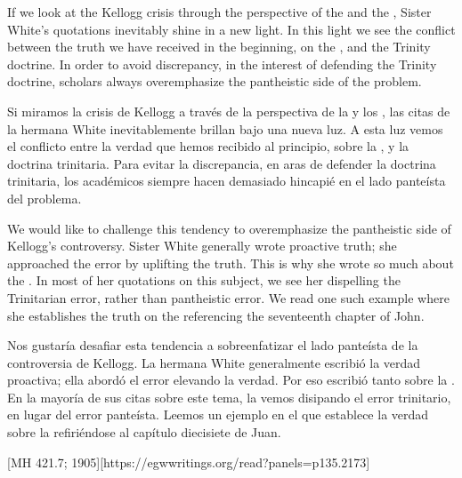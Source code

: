 



If we look at the Kellogg crisis through the perspective of the  and the , Sister White’s quotations inevitably shine in a new light. In this light we see the conflict between the truth we have received in the beginning, on the , and the Trinity doctrine. In order to avoid discrepancy, in the interest of defending the Trinity doctrine, scholars always overemphasize the pantheistic side of the problem.


Si miramos la crisis de Kellogg a través de la perspectiva de la  y los , las citas de la hermana White inevitablemente brillan bajo una nueva luz. A esta luz vemos el conflicto entre la verdad que hemos recibido al principio, sobre la , y la doctrina trinitaria. Para evitar la discrepancia, en aras de defender la doctrina trinitaria, los académicos siempre hacen demasiado hincapié en el lado panteísta del problema.


We would like to challenge this tendency to overemphasize the pantheistic side of Kellogg’s controversy. Sister White generally wrote proactive truth; she approached the error by uplifting the truth. This is why she wrote so much about the . In most of her quotations on this subject, we see her dispelling the Trinitarian error, rather than pantheistic error. We read one such example where she establishes the truth on the  referencing the seventeenth chapter of John.


Nos gustaría desafiar esta tendencia a sobreenfatizar el lado panteísta de la controversia de Kellogg. La hermana White generalmente escribió la verdad proactiva; ella abordó el error elevando la verdad. Por eso escribió tanto sobre la . En la mayoría de sus citas sobre este tema, la vemos disipando el error trinitario, en lugar del error panteísta. Leemos un ejemplo en el que establece la verdad sobre la  refiriéndose al capítulo diecisiete de Juan.


[MH 421.7; 1905][https://egwwritings.org/read?panels=p135.2173]


